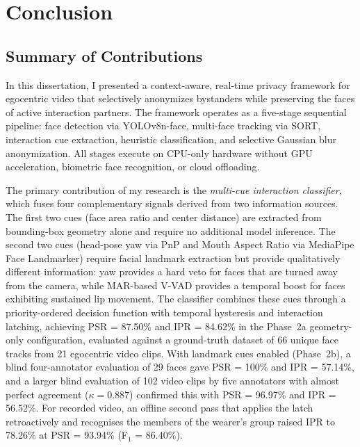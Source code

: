 \chapter{Conclusion}
\label{sec:conclusion}

\section{Summary of Contributions}
\label{sec:conclusion_summary}

In this dissertation, I presented a context-aware, real-time privacy framework for
egocentric video that selectively anonymizes bystanders while preserving the faces
of active interaction partners. The framework operates as a five-stage sequential
pipeline: face detection via YOLOv8n-face, multi-face tracking via SORT, interaction
cue extraction, heuristic classification, and selective Gaussian blur anonymization.
All stages execute on CPU-only hardware without GPU acceleration, biometric face
recognition, or cloud offloading.

The primary contribution of my research is the \emph{multi-cue interaction
classifier}, which fuses four complementary signals derived from two information
sources. The first two cues (face area ratio and center distance) are extracted
from bounding-box geometry alone and require no additional model inference. The
second two cues (head-pose yaw via PnP and Mouth Aspect Ratio via MediaPipe Face
Landmarker) require facial landmark extraction but provide qualitatively different
information: yaw provides a hard veto for faces that are turned away from the
camera, while MAR-based V-VAD provides a temporal boost for faces exhibiting
sustained lip movement. The classifier combines these cues through a priority-ordered
decision function with temporal hysteresis and interaction latching, achieving PSR
= 87.50\% and IPR = 84.62\% in the Phase~2a geometry-only configuration, evaluated
against a ground-truth dataset of 66 unique face tracks from 21 egocentric video clips.
With landmark cues enabled (Phase~2b), a blind four-annotator evaluation of 29 faces
gave PSR = 100\% and IPR = 57.14\%, and a larger blind evaluation of 102 video
clips by five annotators with almost perfect agreement ($\kappa = 0.887$) confirmed this
with PSR = 96.97\% and IPR = 56.52\%. For recorded video, an offline second pass
that applies the latch retroactively and recognises the members of the wearer's
group raised IPR to 78.26\% at PSR = 93.94\% (F$_1$ = 86.40\%).

